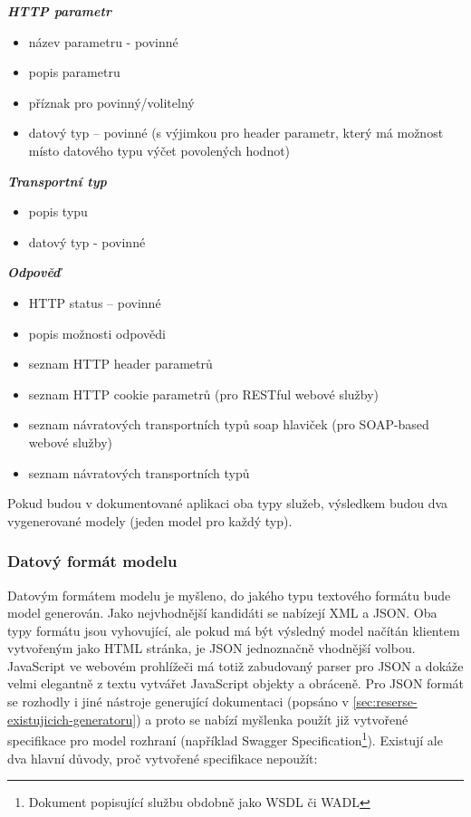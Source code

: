 \documentclass[11pt,twoside,a4paper]{book}
\begin{document}
\textbf{\textit{HTTP parametr}}

\begin{itemize}
  \item název parametru - povinné
  \item popis parametru
  \item příznak pro povinný/volitelný
  \item datový typ – povinné (s výjimkou pro header parametr, který má možnost
  místo datového typu výčet povolených hodnot)
\end{itemize}

\textbf{\textit{Transportní typ}}

\begin{itemize}
  \item popis typu
  \item datový typ - povinné
\end{itemize}

\textbf{\textit{Odpověď}}

\begin{itemize}
  \item HTTP status – povinné
  \item popis možnosti odpovědi
  \item seznam HTTP header parametrů
  \item seznam HTTP cookie parametrů (pro RESTful webové služby)
  \item seznam návratových transportních typů soap hlaviček (pro SOAP-based webové služby)
  \item seznam návratových transportních typů
\end{itemize}

Pokud budou v dokumentované aplikaci oba typy služeb, výsledkem budou dva
vygenerované modely (jeden model pro každý typ).

\subsubsection{Datový formát modelu}

Datovým formátem modelu je myšleno, do jakého typu textového formátu bude model
generován. Jako nejvhodnější kandidáti se nabízejí XML a JSON. Oba typy formátu
jsou vyhovující, ale pokud má být výsledný model načítán klientem vytvořeným
jako HTML stránka, je JSON jednoznačně vhodnější volbou. JavaScript ve webovém
prohlížeči má totiž zabudovaný parser pro JSON a dokáže velmi elegantně z textu
vytvářet JavaScript objekty a obráceně. Pro JSON formát se rozhodly i jiné
nástroje generující dokumentaci (popsáno v
\ref{sec:reserse-existujicich-generatoru}) a proto se nabízí myšlenka použít již
vytvořené specifikace pro model rozhraní (například Swagger
Specification\footnote{Dokument popisující službu obdobně jako WSDL či WADL}).
Existují ale dva hlavní důvody, proč vytvořené specifikace nepoužít:
\end{document}
